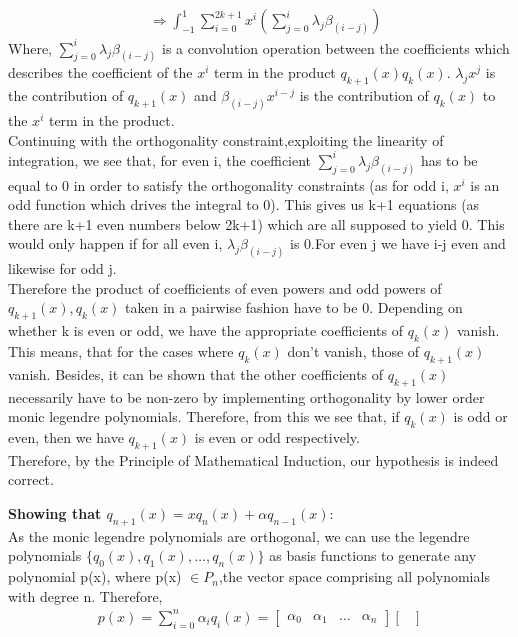 \documentclass[letterpaper]{exam}
\begin{document}
\begin{questions}
\begin{parts}
\begin{solution}
\begin{itemize}
\begin{align*}
       &\Rightarrow
        \int_{-1}^{1} \sum_{i=0}^{2k+1}x^i\left(\sum_{j=0}^{i} \lambda_{j}\beta_{(i-j)}\right)
    \end{align*}
    Where, $\sum_{j=0}^{i} \lambda_{j}\beta_{(i-j)}$ is a convolution operation between the coefficients which describes the coefficient of the $x^i$ term in the product $q_{k+1}(x)q_{k}(x)$. $\lambda_{j}x^j$ is the contribution of $q_{k+1}(x)$ and $\beta_{(i-j)}x^{i-j}$ is the contribution of $q_{k}(x)$ to the $x^i$ term in the product.\\
    Continuing with the orthogonality constraint,exploiting the linearity of integration, we see that, for even i, the coefficient $\sum_{j=0}^{i} \lambda_{j}\beta_{(i-j)}$ has to be equal to 0 in order to satisfy the orthogonality constraints (as for odd i, $x^i$ is an odd function which drives the integral to 0). This gives us k+1 equations (as there are k+1 even numbers below 2k+1) which are all supposed to yield 0. This would only happen if for all even i, $\lambda_{j}\beta_{(i-j)}$ is 0.For even j we have i-j even and likewise for odd j.\\
    Therefore the product of coefficients of even powers and odd powers of $q_{k+1}(x),q_{k}(x)$ taken in a pairwise fashion have to be 0. Depending on whether k is even or odd, we have the appropriate coefficients of $q_{k}(x)$ vanish. This means, that for the cases where $q_{k}(x)$ don't vanish, those of $q_{k+1}(x)$ vanish. Besides, it can be shown that the other coefficients of $q_{k+1}(x)$ necessarily have to be non-zero by implementing orthogonality by lower order monic legendre polynomials. Therefore, from this we see that, if $q_{k}(x)$ is odd or even, then we have $q_{k+1}(x)$ is even or odd respectively.\\
    Therefore, by the Principle of Mathematical Induction, our hypothesis is indeed correct. 
\end{itemize}
\textbf{Showing that $q_{n+1}(x) = xq_{n}(x) + \alpha q_{n-1}(x)$}:\\
As the monic legendre polynomials are orthogonal, we can use the legendre polynomials $\{q_0(x),q_1(x),\ldots,q_n(x)\}$ as basis functions to generate any polynomial p(x), where p(x) $\in P_n$,the vector space comprising all polynomials with degree n. Therefore,
\begin{align}\label{3}
p(x) = \sum_{i=0}^{n} \alpha_{i}q_i(x) = \begin{bmatrix}
\alpha_{0}& \alpha_{1}&\ldots&\alpha_{n} 
\end{bmatrix} \begin{bmatrix}

\end{bmatrix}
\end{align}
\end{solution}
\end{parts}
\end{questions}
\end{document}
